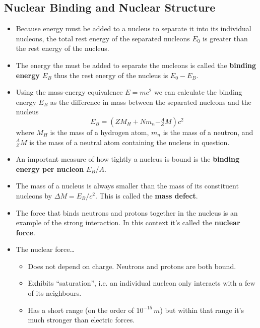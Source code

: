 \documentclass{article}
\begin{document}
\subsection{Nuclear Binding and Nuclear Structure}

\begin{itemize}
  \item Because energy must be added to a nucleus to separate it into its individual nucleons, the total rest energy of the separated nucleons $E_0$ is greater than the rest energy of the nucleus.

  \item The energy the must be added to separate the nucleons is called the \textbf{binding energy $E_B$} thus the rest energy of the nucleus is $E_0 - E_B$.

  \item Using the mass-energy equivalence $E = m c^2$ we can calculate the binding energy $E_B$ as the difference in mass between the separated nucleons and the nucleus \[E_B = (Z M_H + N m_n - ^A_Z M) c^2\] where $M_H$ is the mass of a hydrogen atom, $m_n$ is the mass of a neutron, and $^A_Z M$ is the mass of a neutral atom containing the nucleus in question.

  \item An important measure of how tightly a nucleus is bound is the \textbf{binding energy per nucleon} $E_B / A$.

  \item The mass of a nucleus is always smaller than the mass of its constituent nucleons by $\Delta M = E_B / c^2$. This is called the \textbf{mass defect}.

  \item The force that binds neutrons and protons together in the nucleus is an example of the strong interaction. In this context it's called the \textbf{nuclear force}.

  \item The nuclear force…

        \begin{itemize}
          \item Does not depend on charge. Neutrons and protons are both bound.

          \item Exhibits ``saturation'', i.e. an individual nucleon only interacts with a few of its neighbours.

          \item Has a short range (on the order of $10^{-15} \,\unit{m}$) but within that range it's much stronger than electric forces.


\end{itemize}
\end{itemize}
\end{document}
